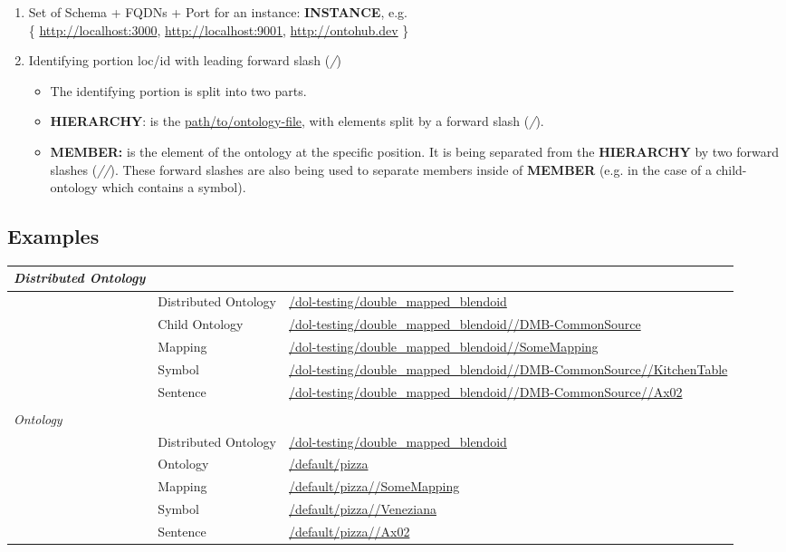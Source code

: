 \documentclass[a4paper,11pt,DIV=22]{scrartcl}
\begin{document}
\begin{enumerate}
  \item Set of Schema + FQDNs + Port for an instance: \textbf{INSTANCE}, e.g.\\
    \{ \url{http://localhost:3000}, \url{http://localhost:9001}, \url{http://ontohub.dev} \}
  \item Identifying portion loc/id with leading forward slash (\emph{/})
  \begin{itemize}
    \item The identifying portion is split into two parts.
    \item \textbf{HIERARCHY}: is the \url{path/to/ontology-file}, with elements split
      by a forward slash (\emph{/}).
    \item \textbf{MEMBER:} is the element of the ontology at the specific
      position. It is being separated from the \textbf{HIERARCHY} by two
      forward slashes (\emph{//}). These forward slashes are also being used
      to separate members inside of \textbf{MEMBER} (e.g. in the case of a
      child-ontology which contains a symbol).
  \end{itemize}
\end{enumerate}

\subsection{Examples}

\begin{tabularx}{\textwidth}{p{}p{}p{}}
  \emph{Distributed Ontology} & & \\
  \hline
  & Distributed Ontology & \url{/dol-testing/double_mapped_blendoid}\\
  & Child Ontology & \url{/dol-testing/double_mapped_blendoid//DMB-CommonSource}\\
  & Mapping & \url{/dol-testing/double_mapped_blendoid//SomeMapping}\\
  & Symbol & \url{/dol-testing/double_mapped_blendoid//DMB-CommonSource//KitchenTable}\\
  & Sentence & \url{/dol-testing/double_mapped_blendoid//DMB-CommonSource//Ax02}\\
  & & \\
  \emph{Ontology} & & \\
  \hline
  & Distributed Ontology & \url{/dol-testing/double_mapped_blendoid}\\
  & Ontology & \url{/default/pizza}\\
  & Mapping & \url{/default/pizza//SomeMapping}\\
  & Symbol & \url{/default/pizza//Veneziana}\\
  & Sentence & \url{/default/pizza//Ax02}\\
\end{tabularx}
\end{document}
